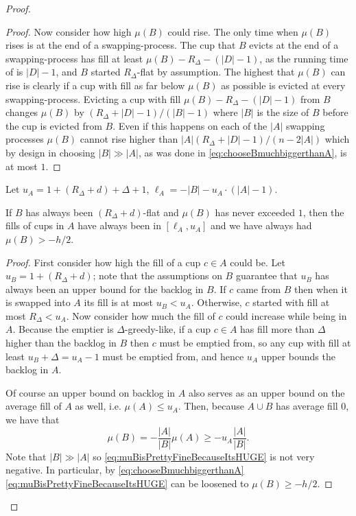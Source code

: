 \begin{proof}
\begin{proof}
  Now consider how high $\mu(B)$ could rise.
  The only time when $\mu(B)$ rises is at the end of a
  swapping-process. The cup that $B$ evicts at the end of a
  swapping-process has fill at least $\mu(B) - R_\Delta - (|D|-1)$,
  as the running time of \randalg is $|D|-1$, and $B$ started
  $R_\Delta$-flat by assumption. The highest that $\mu(B)$ can
  rise is clearly if a cup with fill as far below $\mu(B)$ as possible is
  evicted at every swapping-process. Evicting a cup with fill
  $\mu(B) - R_\Delta - (|D| -1)$ from $B$ changes $\mu(B)$ by 
  $(R_\Delta + |D| - 1) / (|B|-1)$ where $|B|$
  is the size of $B$ before the cup is evicted from $B$. 
  Even if this happens on each of the $|A|$ swapping processes
  $\mu(B)$ cannot rise higher than $|A| (R_\Delta + |D|-1) /
  (n-2|A|)$ which by design in choosing $|B| \gg |A|$,
  as was done in \eqref{eq:chooseBmuchbiggerthanA}, is
  at most $1$.

\end{proof}

Let $u_A = 1 + (R_\Delta + d) + \Delta + 1$, $\ell_A = -|B|
-u_A \cdot (|A| -1)$.
\begin{clm}
  \label{clm:oblivBaseIntenseInduction2}
  If $B$ has always been $(R_\Delta + d)$-flat and $\mu(B)$ has
  never exceeded $1$, then the fills of cups in $A$ have always
  been in $[\ell_A, u_A]$ and we have always had $\mu(B) > -h/2$.
\end{clm}
\begin{proof}
  First consider how high the fill of a cup $c\in A$ could be.
  Let $u_B = 1 + (R_\Delta + d)$; note that the assumptions on
  $B$ guarantee that $u_B$ has always been an upper bound for the
  backlog in $B$. If $c$ came from $B$ then when it is swapped
  into $A$ its fill is at most $u_B < u_A$. Otherwise, $c$
  started with fill at most $R_\Delta < u_A$. Now consider how
  much the fill of $c$ could increase while being in $A$. Because
  the emptier is $\Delta$-greedy-like, if a cup $c\in A$ has fill
  more than $\Delta$ higher than the backlog in $B$ then $c$ must
  be emptied from, so any cup with fill at least $u_B + \Delta =
  u_A - 1$ must be emptied from, and hence $u_A$ upper bounds the
  backlog in $A$. 

  Of course an upper bound on backlog in $A$ also serves as
  an upper bound on the average fill of $A$ as well, i.e. $\mu(A)
  \le u_A$. Then, because $A\cup B$ has average fill $0$, we have that 
  \begin{equation}
    \label{eq:muBisPrettyFineBecauseItsHUGE}
    \mu(B) = -\frac{|A|}{|B|} \mu(A) \ge -u_A \frac{|A|}{|B|}.
  \end{equation}
  Note that $|B| \gg |A|$ so
  \eqref{eq:muBisPrettyFineBecauseItsHUGE} is not very negative.
  In particular, by \eqref{eq:chooseBmuchbiggerthanA}
  \eqref{eq:muBisPrettyFineBecauseItsHUGE} can be loosened to $\mu(B) \ge -h/2$.


\end{proof}
\end{proof}
